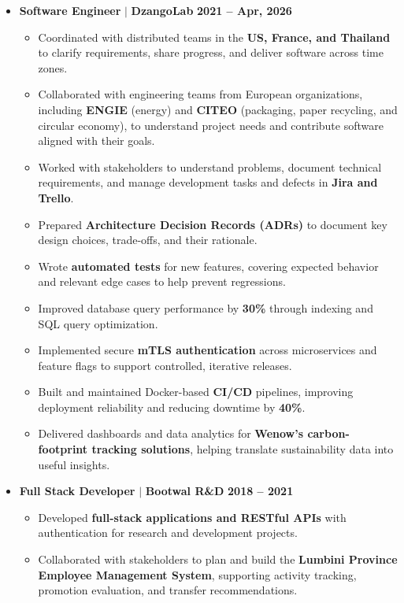 \documentclass[10pt,a4paper]{article}
\begin{document}
\begin{itemize}[leftmargin=1em, label={}]
    \item \textbf{Software Engineer} $|$ \textbf{DzangoLab} \hfill \textbf{2021 -- Apr, 2026}
    \begin{itemize}
        \item Coordinated with distributed teams in the \textbf{US, France, and Thailand} to clarify requirements, share progress, and deliver software across time zones.
        \item Collaborated with engineering teams from European organizations, including \textbf{ENGIE} (energy) and \textbf{CITEO} (packaging, paper recycling, and circular economy), to understand project needs and contribute software aligned with their goals.
        \item Worked with stakeholders to understand problems, document technical requirements, and manage development tasks and defects in \textbf{Jira and Trello}.
        \item Prepared \textbf{Architecture Decision Records (ADRs)} to document key design choices, trade-offs, and their rationale.
        \item Wrote \textbf{automated tests} for new features, covering expected behavior and relevant edge cases to help prevent regressions.
        \item Improved database query performance by \textbf{30\%} through indexing and SQL query optimization.
        \item Implemented secure \textbf{mTLS authentication} across microservices and feature flags to support controlled, iterative releases.
        \item Built and maintained Docker-based \textbf{CI/CD} pipelines, improving deployment reliability and reducing downtime by \textbf{40\%}.
        \item Delivered dashboards and data analytics for \textbf{Wenow's carbon-footprint tracking solutions}, helping translate sustainability data into useful insights.
    \end{itemize}

    \vspace{6pt}

    \item \textbf{Full Stack Developer} $|$ \textbf{Bootwal R\&D} \hfill \textbf{2018 -- 2021}
    \begin{itemize}
        \item Developed \textbf{full-stack applications and RESTful APIs} with authentication for research and development projects.
        \item Collaborated with stakeholders to plan and build the \textbf{Lumbini Province Employee Management System}, supporting activity tracking, promotion evaluation, and transfer recommendations.
    \end{itemize}

\end{itemize}
\end{document}
